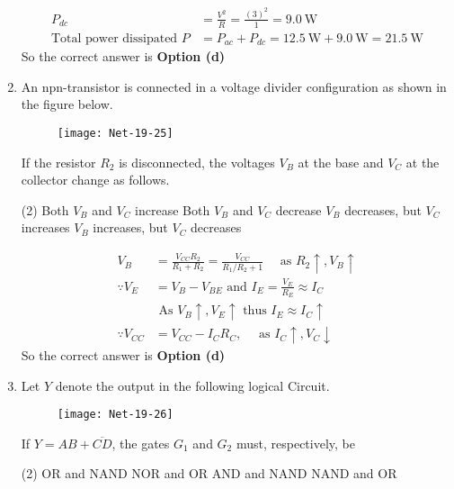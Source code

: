 \begin{enumerate}
\begin{answer}
\begin{align*}
	P_{d c}&=\frac{V^{2}}{R}=\frac{(3)^{2}}{1}=9.0 \mathrm{~W}\\
	\text{Total power dissipated }P&=P_{a c}+P_{d c}=12.5 \mathrm{~W}+9.0 \mathrm{~W}=21.5 \mathrm{~W}
	\end{align*}
		So the correct answer is \textbf{Option (d)}
\end{answer}
\item  An npn-transistor is connected in a voltage divider configuration as shown in the figure below.
\begin{figure}[H]
	\centering
	\texttt{[image: Net-19-25]}
\end{figure}
If the resistor $R_{2}$ is disconnected, the voltages $V_{B}$ at the base and $V_{C}$ at the collector change as follows.
 \begin{tasks}(2)
	\task[\textbf{a.}]Both $V_{B}$ and $V_{C}$ increase
	\task[\textbf{b.}]Both $V_{B}$ and $V_{C}$ decrease
	\task[\textbf{c.}]$V_{B}$ decreases, but $V_{C}$ increases
	\task[\textbf{d.}]$V_{B}$ increases, but $V_{C}$ decreases
\end{tasks}
\begin{answer}
	\begin{align*}
	V_{B}&=\frac{V_{C C} R_{2}}{R_{1}+R_{2}}=\frac{V_{C C}}{R_{1} / R_{2}+1} \quad \text { as } R_{2} \uparrow, V_{B} \uparrow\\
	\because V_{E}&=V_{B}-V_{B E} \text { and } I_{E}=\frac{V_{E}}{R_{E}} \approx I_{C} \\
	\quad& \text { As } V_{B} \uparrow, V_{E} \uparrow \text { thus } I_{E} \approx I_{C} \uparrow \\
	\because V_{C C}&=V_{C C}-I_{C} R_{C}, \quad \text { as } I_{C} \uparrow, V_{C} \downarrow
	\end{align*}
		So the correct answer is \textbf{Option (d)}
\end{answer}
\item  Let $Y$ denote the output in the following logical Circuit.
\begin{figure}[H]
	\centering
	\texttt{[image: Net-19-26]}
\end{figure}
If $Y=A B+\overline{C D}$, the gates $G_{1}$ and $G_{2}$ must, respectively, be
 \begin{tasks}(2)
	\task[\textbf{a.}]OR and NAND
	\task[\textbf{b.}]NOR and $\mathrm{OR}$
	\task[\textbf{c.}] AND and NAND
	\task[\textbf{d.}]  NAND and OR
\end{tasks}
\begin{answer}
	\begin{align*}

\end{align*}
\end{answer}
\end{enumerate}
